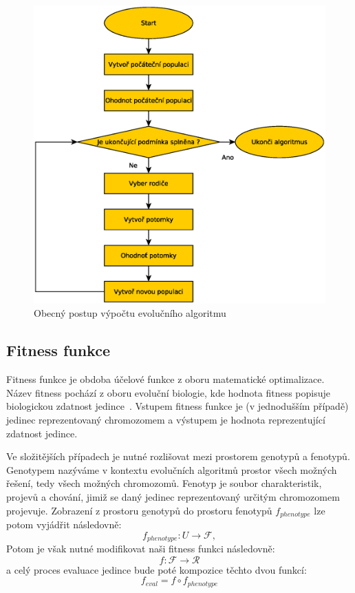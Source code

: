 \begin{figure}[!ht]
	\centering
	\includegraphics[scale=0.4]{fig/evolution_algorithm_flowchart}	
	\caption{Obecný postup výpočtu evolučního algoritmu}
	\label{fig:eaflow}
\end{figure}

\subsection{Fitness funkce}
Fitness funkce je obdoba účelové funkce z oboru matematické optimalizace. Název fitness
pochází z oboru evoluční biologie, kde hodnota fitness popisuje biologickou zdatnost jedince~\cite{evolution_hardware}.
Vstupem fitness funkce je (v jednodušším případě) jedinec
reprezentovaný chromozomem a výstupem je hodnota reprezentující zdatnost jedince.

Ve složitějších případech je nutné rozlišovat mezi prostorem genotypů a fenotypů. Genotypem
nazýváme v kontextu evolučních algoritmů prostor všech možných řešení, tedy 
všech možných chromozomů. Fenotyp je soubor charakteristik, projevů a chování,
jimiž se daný jedinec reprezentovaný určitým chromozomem projevuje.
Zobrazení z prostoru genotypů do prostoru fenotypů $f_{phenotype}$ lze potom vyjádřit následovně:
$$ f_{phenotype} : U \to \mathcal{F}, $$
Potom je však nutné modifikovat naši fitness funkci následovně:
$$ f : \mathcal{F} \to \mathcal{R} $$
a celý proces evaluace jedince bude poté kompozice těchto dvou funkcí:
$$ f_{eval} = f \circ f_{phenotype}$$

